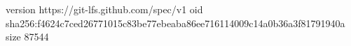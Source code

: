 version https://git-lfs.github.com/spec/v1
oid sha256:f4624c7ced26771015c83be77ebeaba86ee716114009c14a0b36a3f81791940a
size 87544
